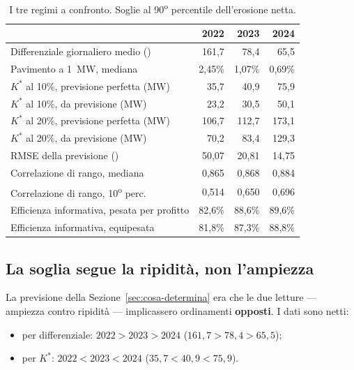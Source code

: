 \begin{table}[H]
\centering
\caption{I tre regimi a confronto. Soglie al 90\textsuperscript{o} percentile dell'erosione
netta.}
\label{tab:regimi}
\begin{tabular}{@{}lrrr@{}}
\toprule
 & \textbf{2022} & \textbf{2023} & \textbf{2024} \\
\midrule
Differenziale giornaliero medio (\euromwh{}) & 161,7 & 78,4 & 65,5 \\
Pavimento a 1~MW, mediana                    & 2,45\% & 1,07\% & 0,69\% \\
\midrule
$K^*$ al 10\%, previsione perfetta (MW)      & 35,7  & 40,9  & 75,9 \\
$K^*$ al 10\%, da previsione (MW)            & 23,2  & 30,5  & 50,1 \\
$K^*$ al 20\%, previsione perfetta (MW)      & 106,7 & 112,7 & 173,1 \\
$K^*$ al 20\%, da previsione (MW)            & 70,2  & 83,4  & 129,3 \\
\midrule
\ac{RMSE} della previsione (\euromwh{})      & 50,07 & 20,81 & 14,75 \\
Correlazione di rango, mediana               & 0,865 & 0,868 & 0,884 \\
Correlazione di rango, 10\textsuperscript{o} perc. & 0,514 & 0,650 & 0,696 \\
\midrule
Efficienza informativa, pesata per profitto  & 82,6\% & 88,6\% & 89,6\% \\
Efficienza informativa, equipesata           & 81,8\% & 87,3\% & 88,8\% \\
\bottomrule
\end{tabular}
\end{table}

\subsection{La soglia segue la ripidit\`a, non l'ampiezza}

La previsione della Sezione~\ref{sec:cosa-determina} era che le due letture --- ampiezza
contro ripidit\`a --- implicassero ordinamenti \textbf{opposti}. I dati sono netti:

\begin{itemize}
  \item per differenziale: $2022 > 2023 > 2024$ ($161{,}7 > 78{,}4 > 65{,}5$);
  \item per $K^*$: $2022 < 2023 < 2024$ ($35{,}7 < 40{,}9 < 75{,}9$).
\end{itemize}

